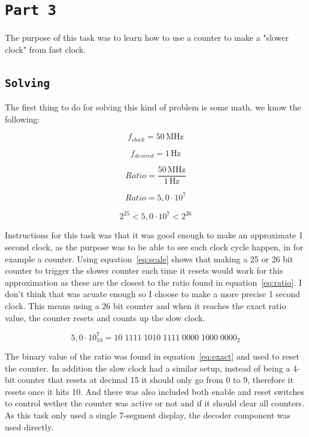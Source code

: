 \documentclass{article}
\newcounter{codeblock} %
\let\oldsection\section
\renewcommand{\section}[1]{%
  \oldsection{\texttt{#1}} %
  \setcounter{subsection}{-1} %
  \setcounter{figure}{-1} %
  \setcounter{table}{-1} %
  \setcounter{codeblock}{-1}
}
\let\oldsubsection\subsection
\renewcommand{\subsection}[1]{%
  \oldsubsection{\texttt{#1}}%
  \setcounter{subsubsection}{-1}%
}
\newcommand{\unit}[1]{\ensuremath{\, \mathrm{#1}}}
\begin{document}
\section{Part 3}
The purpose of this task was to learn how to use a counter to make a "slower clock" from fast clock.


\subsection{Solving}
The first thing to do for solving this kind of problem is some math. we know the following:

\begin{equation*}
    f_{clock} = 50\unit{MHz}
\end{equation*}

\begin{equation*}
    f_{desired} = 1\unit{Hz}
\end{equation*}

\begin{equation*}
    Ratio = \frac{50\unit{MHz}}{1\unit{Hz}}
\end{equation*}

\begin{equation}
    Ratio = 5,0 \cdot 10^7
    \label{eq:ratio}
\end{equation}

\begin{equation}
    2^{25}< 5,0 \cdot 10^7 < 2^{26}
    \label{eq:scale}
\end{equation}


Instructions for this task was that it was good enough to make an approximate 1 second clock, as the purpose was to be able to see each clock cycle happen, in for example a counter. Using equation~\ref{eq:scale} shows that making a 25 or 26 bit counter to trigger the slower counter each time it resets would work for this approximation as these are the closest to the ratio found in equation~\ref{eq:ratio}. I don't think that was acuate enough so I choose to make a more precise 1 second clock. This means using a 26 bit counter and when it reaches the exact ratio value, the counter resets and counts up the slow clock.

\begin{equation}
    5,0 \cdot 10^7_{10} = 10\;1111\;1010\;1111\;0000\;1000\;0000_{2}
    \label{eq:exact}
\end{equation}

The binary value of the ratio was found in equation~\ref{eq:exact} and used to reset the counter. In addition the slow clock had a similar setup, instead of being a 4-bit counter that resets at decimal 15 it should only go from 0 to 9, therefore it resets once it hits 10. And there was also included both enable and reset switches to control wether the counter was active or not and if it should clear all counters. As this task only used a single 7-segment display, the decoder component was used directly.
\end{document}
